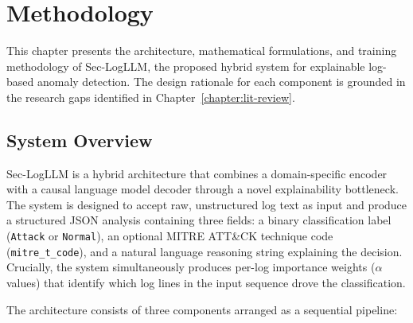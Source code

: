 \section{Methodology}\label{chapter:methodology}

This chapter presents the architecture, mathematical formulations, and training methodology of Sec-LogLLM, the proposed hybrid system for explainable log-based anomaly detection. The design rationale for each component is grounded in the research gaps identified in Chapter~\ref{chapter:lit-review}.

\subsection{System Overview}\label{sec:system-overview}

Sec-LogLLM is a hybrid architecture that combines a domain-specific encoder with a causal language model decoder through a novel explainability bottleneck. The system is designed to accept raw, unstructured log text as input and produce a structured JSON analysis containing three fields: a binary classification label (\texttt{Attack} or \texttt{Normal}), an optional MITRE ATT\&CK technique code (\texttt{mitre\_t\_code}), and a natural language reasoning string explaining the decision. Crucially, the system simultaneously produces per-log importance weights ($\alpha$ values) that identify which log lines in the input sequence drove the classification.

The architecture consists of three components arranged as a sequential pipeline:


